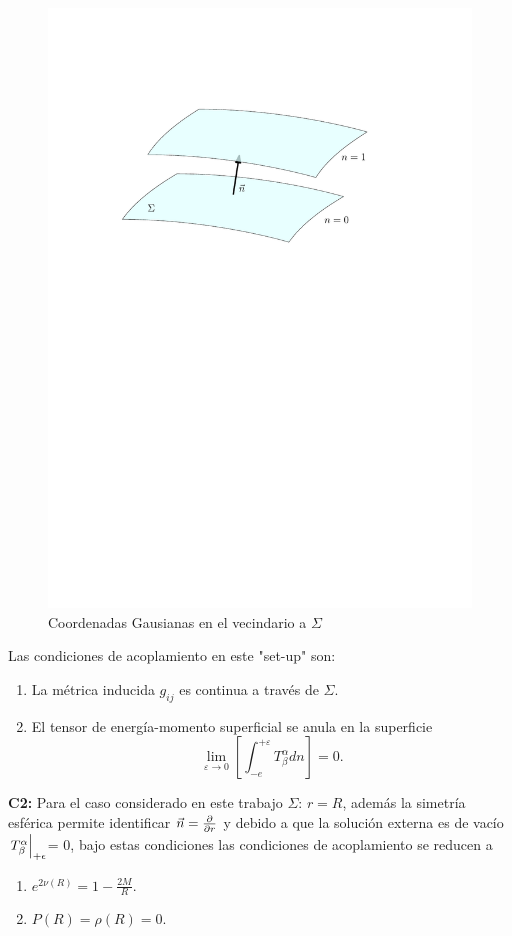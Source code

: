  \begin{figure}[H]
     \centering
     \includegraphics[width=0.7\linewidth]{figures/Junction.pdf}
     \caption{Coordenadas Gausianas en el vecindario a $\Sigma$}
     \label{JC}
 \end{figure}
Las condiciones de acoplamiento en este "set-up" son:
 \begin{enumerate}[leftmargin=2cm]
     \item La métrica inducida $g_{ij}$ es continua a través de $\Sigma$.
     \item El tensor de energía-momento superficial se anula en la superficie
     \begin{equation}
\lim _{\varepsilon \rightarrow 0}\left[\int_{-e}^{+\varepsilon} T_{\beta}^{\alpha} d n\right]=0.
    \end{equation}
     
 \end{enumerate}
 
 \textbf{C2:} Para el caso considerado en este trabajo $\Sigma:\,r=R$, además la simetría esférica permite identificar $\vec{n}=\pdv{r}$ y debido a que la solución externa es de vacío $\eval{T^{\alpha}_{\beta}}_{+\epsilon}$= 0, bajo estas condiciones las condiciones de acoplamiento se reducen a
 \begin{enumerate}[leftmargin=2cm]
     \item $e ^ {  2 \nu(R) } =  1 - \frac { 2 M } { R }$.
    \item $P(R)=\rho(R)=0$.
 \end{enumerate}



